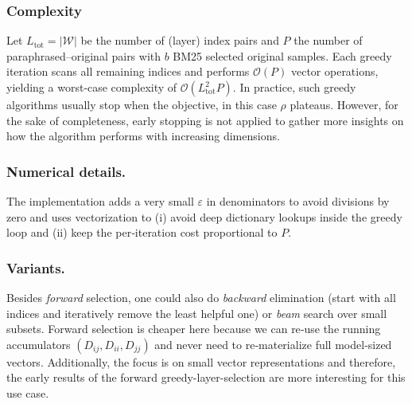 \subsubsection{Complexity}
Let $L_\text{tot}=|\mathcal{W}|$ be the number of (layer) index pairs and $P$ the number of paraphrased–original pairs with $b$ BM25 selected original samples. Each greedy iteration scans all remaining indices and performs $\mathcal{O}(P)$ vector operations, yielding a worst‑case complexity of $\mathcal{O}(L_\text{tot}^2 P)$. In practice, such greedy algorithms usually stop when the objective, in this case $\rho$ plateaus. However, for the sake of completeness, early stopping is not applied to gather more insights on how the algorithm performs with increasing dimensions.

\subsubsection{Numerical details.}
The implementation adds a very small $\varepsilon$ in denominators to avoid divisions by zero and uses vectorization to (i) avoid deep dictionary lookups inside the greedy loop and (ii) keep the per‑iteration cost proportional to $P$.

\subsubsection{Variants.}
Besides \emph{forward} selection, one could also do \emph{backward} elimination (start with all indices and iteratively remove the least helpful one) or \emph{beam} search over small subsets. Forward selection is cheaper here because we can re‑use the running accumulators $(D_{ij},D_{ii},D_{jj})$ and never need to re‑materialize full model‑sized vectors. Additionally, the focus is on small vector representations and therefore, the early results of the forward greedy-layer-selection are more interesting for this use case.

